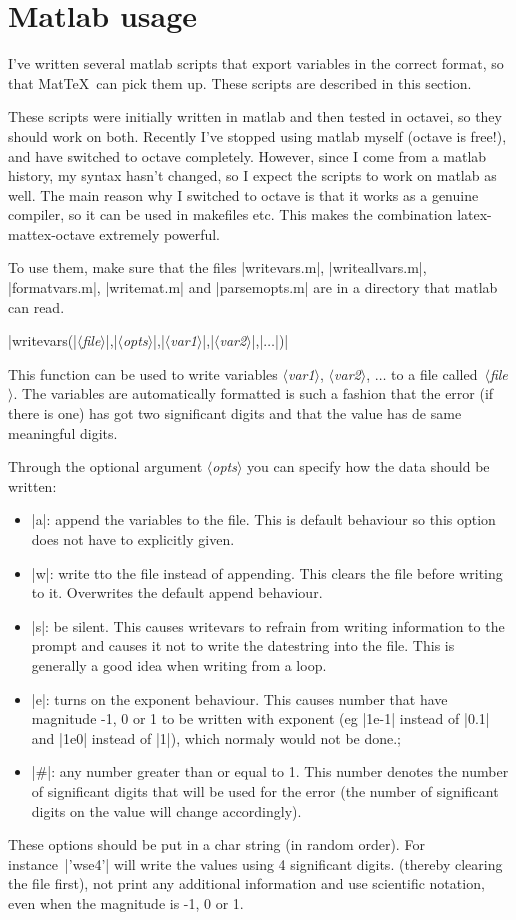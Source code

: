 \documentclass[a4paper,10pt]{article}
\makeatletter
\newcommand{\mt}{Mat\TeX\ }
\newcommand\argu[1]{{\color{black}$\langle$\textit{#1}$\rangle$}}
\newcommand\co[0]{\color{violet}}
\newcommand\mtmrg[1]{\marginpar{\texttt{#1}}}
\newcommand\mmrg[1]{\index{#1@\texttt{#1}}\mtmrg{#1}}
\makeatother
\begin{document}
\section{Matlab usage}
I've written several matlab scripts that export variables in the correct format, so that \mt can pick them up. These scripts are described in this section. 

These scripts were initially written in matlab and then tested in octavei, so they should work on both. Recently I've stopped using matlab myself (octave is free!), and have switched to octave completely. However, since I come from a matlab history, my syntax hasn't changed, so I expect the scripts to work on matlab as well. The main reason why I switched to octave is that it works as a genuine compiler, so it can be used in makefiles etc. This makes the combination latex-mattex-octave extremely powerful.

To use them, make sure that the files |writevars.m|, |writeallvars.m|,\\ |formatvars.m|, |writemat.m| and |parsemopts.m| are in a directory that matlab can read.

\bigskip
{\co |writevars(|\argu{file}|,|\argu{opts}|,|\argu{var1}|,|\argu{var2}|,|$\ldots$|)|}

\mmrg{writevars}
This function can be used to write variables \argu{var1}, \argu{var2}, $\ldots$ to a file called~\argu{file}. The variables are automatically formatted is such a fashion that the error (if there is one) has got two significant digits and that the value has de same meaningful digits.

Through the optional argument \argu{opts} you can specify how the data should be written:
\begin{itemize}
	\item |a|: append the variables to the file. This is default behaviour so this option does not have to explicitly given.
	\item |w|: write tto the file instead of appending. This clears the file before writing to it. Overwrites the default append behaviour.
	\item |s|: be silent. This causes writevars to refrain from writing information to the prompt and causes it not to write the datestring into the file. This is generally a good idea when writing from a loop.
	\item |e|: turns on the exponent behaviour. This causes number that have magnitude -1, 0 or 1 to be written with exponent (eg |1e-1| instead of |0.1| and |1e0| instead of |1|), which normaly would not be done.;
	\item |#|: any number greater than or equal to 1. This number denotes the number of significant digits that will be used for the error (the number of significant digits on the value will change accordingly).
\end{itemize}
These options should be put in a char string (in random order). For instance~|'wse4'| will write the values using 4 significant digits. (thereby clearing the file first), not print any additional information and use scientific notation, even when the magnitude is -1, 0 or 1.
\end{document}
